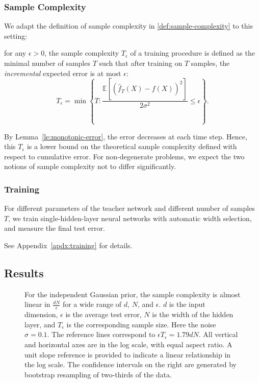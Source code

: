 \documentclass[twoside,11pt]{article}
\begin{document}
\subsubsection{Sample Complexity}
We adapt the definition of sample complexity in \ref{def:sample-complexity} to this setting:

for any $\epsilon>0$, the sample complexity $T_\epsilon$ of a training procedure is defined as the minimal number of samples $T$ such that after training on $T$ samples, the \emph{incremental} expected error is at most $\epsilon$:
\[
   T_\epsilon = \min \left\{
   T :
   \frac{\mathbb{E}\left[\left(\hat{f}_T(X)-f(X)\right)^2\right]}{2\sigma^2}
   \leq \epsilon
   \right\}
   .
\]

By Lemma~\ref{le:monotonic-error}, the error decreases at each time step.
Hence, this $T_{\epsilon}$ is a lower bound on the theoretical sample complexity defined with respect to cumulative error. For non-degenerate problems, we expect the two notions of sample complexity not to differ significantly.

\subsubsection{Training}
For different parameters of the teacher network and different number of samples $T$, we train single-hidden-layer neural networks with automatic width selection, and measure the final test error.

See Appendix~\ref{apdx:training} for details.
\subsection{Results}

\begin{figure}[htb]
  \centering
  \caption{
    For the independent Gaussian prior, the sample complexity is almost linear in $\frac{dN}{\epsilon}$ 
for a wide range of $d$, $N$, and $\epsilon$.
    $d$ is the input dimension, $\epsilon$ is the average test error, $N$ is the width of the hidden layer, and $T_\epsilon$ is the corresponding sample size.
    Here the noise $\sigma=0.1$.
    The reference lines correspond to $\epsilon T_\epsilon=1.79dN$.
    All vertical and horizontal axes are in the log scale, with equal aspect ratio.
    A unit slope reference is provided to indicate a linear relationship in the log scale.
    The confidence intervals on the right are generated by bootstrap resampling of two-thirds of the data.
  }
  \label{fig:sample-complexity-independent-main}
\end{figure}
\end{document}
